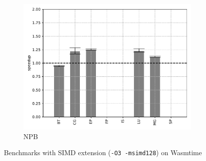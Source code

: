 \begin{figure}
\begin{subfigure}[t]{.45\textwidth}
        \includegraphics[width=\textwidth]
        {Images/6.1.RQ1/npb-wasmtime-simd.pdf}
        \caption{NPB}
    \end{subfigure}
    \caption{Benchmarks with SIMD extension (\texttt{-O3 -msimd128})
        on Wasmtime}
    \label{fig:rq1-wasmtime-simd}
\end{figure}

